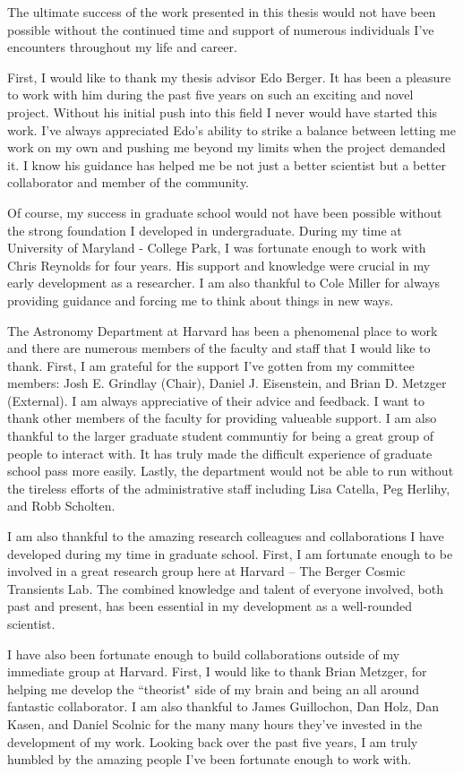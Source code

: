 The ultimate success of the work presented in this thesis would not have been possible without the continued time and support of numerous individuals I've encounters throughout my life and career.

First, I would like to thank my thesis advisor Edo Berger. It has been a pleasure to work with him during the past five years on such an exciting and novel project. Without his initial push into this field I never would have started this work. I've always appreciated Edo's ability to strike a balance between letting me work on my own and pushing me beyond my limits when the project demanded it. I know his guidance has helped me be not just a better scientist but a better collaborator and member of the community.

Of course, my success in graduate school would not have been possible without the strong foundation I developed in undergraduate. During my time at University of Maryland - College Park, I was fortunate enough to work with Chris Reynolds for four years. His support and knowledge were crucial in my early development as a researcher. I am also thankful to Cole Miller for always providing guidance and forcing me to think about things in new ways.

The Astronomy Department at Harvard has been a phenomenal place to work and there are numerous members of the faculty and staff that I would like to thank. First, I am grateful for the support I've gotten from my committee members: Josh E. Grindlay (Chair), Daniel J. Eisenstein, and Brian D. Metzger (External). I am always appreciative of their advice and feedback. I want to thank other members of the faculty for providing valueable support. I am also thankful to the larger graduate student communtiy for being a great group of people to interact with. It has truly made the difficult experience of graduate school pass more easily. Lastly, the department would not be able to run without the tireless efforts of the administrative staff including Lisa Catella, Peg Herlihy, and Robb Scholten.

I am also thankful to the amazing research colleagues and collaborations I have developed during my time in graduate school. First, I am fortunate enough to be involved in a great research group here at Harvard -- The Berger Cosmic Transients Lab. The combined knowledge and talent of everyone involved, both past and present, has been essential in my development as a well-rounded scientist.

I have also been fortunate enough to build collaborations outside of my immediate group at Harvard. First, I would like to thank Brian Metzger, for helping me develop the ``theorist" side of my brain and being an all around fantastic collaborator. I am also thankful to James Guillochon, Dan Holz, Dan Kasen, and Daniel Scolnic for the many many hours they've invested in the development of my work. Looking back over the past five years, I am truly humbled by the amazing people I've been fortunate enough to work with.

